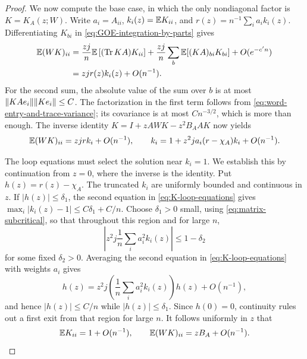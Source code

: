 \begin{proof}
We now compute the base case, in which the only nondiagonal
factor is $K=K_A(z;W)$.  Write
$a_i=A_{ii}$, $k_i(z)=\mathbb E K_{ii}$, and
$r(z)=n^{-1}\sum_i a_i k_i(z)$.  Differentiating $K_{bi}$ in
\eqref{eq:GOE-integration-by-parts} gives
\begin{align*}
 \mathbb E(WK)_{ii}
 &=\frac{zj}{n}\mathbb E\left[(\operatorname{Tr} KA)K_{ii}\right]
   +\frac{zj}{n}\sum_b\mathbb E[(KA)_{bi}K_{bi}]+O(e^{-c'n})\\
 &=zjr(z)k_i(z)+O(n^{-1}).
\end{align*}
For the second sum, the absolute value of the sum over $b$ is at
most $\lVert KAe_i\rVert\lVert Ke_i\rVert\le C$.  The factorization in the
first term follows from \eqref{eq:word-entry-and-trace-variance};
its covariance is at most $C n^{-3/2}$, which is more than enough.
The inverse identity $K=I+zAWK-z^2B_AAK$ now yields
\begin{equation}\label{eq:K-loop-equations}
 \mathbb E(WK)_{ii}=zjr k_i+O(n^{-1}),\qquad
 k_i=1+z^2ja_i(r-\chi_A)k_i+O(n^{-1}).
\end{equation}

The loop equations must select the solution near $k_i=1$.
We establish this by continuation from $z=0$, where the inverse
is the identity.  Put
$h(z)=r(z)-\chi_A$.  The truncated $k_i$ are uniformly bounded and
continuous in $z$.  If $|h(z)|\le\delta_1$, the second equation in
\eqref{eq:K-loop-equations} gives
$\max_i|k_i(z)-1|\le C\delta_1+C/n$.  Choose $\delta_1>0$ small,
using \eqref{eq:matrix-subcritical}, so that throughout this region
and for large $n$,
\[
 \left|z^2j\frac1n\sum_i a_i^2 k_i(z)\right|
 \le1-\delta_2
\]
for some fixed $\delta_2>0$.  Averaging the second equation in
\eqref{eq:K-loop-equations} with weights $a_i$ gives
\[
 h(z)=z^2j\left(\frac1n\sum_i a_i^2k_i(z)\right)h(z)+O(n^{-1}),
\]
and hence $|h(z)|\le C/n$ while $|h(z)|\le\delta_1$.  Since
$h(0)=0$, continuity rules out a first exit from that region for
large $n$.  It follows uniformly in $z$ that
\begin{equation}\label{eq:K-and-WK-bias}
 \mathbb E K_{ii}=1+O(n^{-1}),\qquad
 \mathbb E(WK)_{ii}=zB_A+O(n^{-1}).
\end{equation}


\end{proof}
